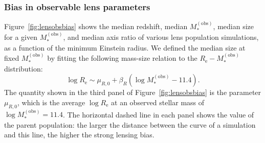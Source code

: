 \documentclass{aa}
\def\reff{R_{\mathrm{e}}}
\def\mobs{M_*^{(\mathrm{obs})}}
\def\Fref#1{Figure~\ref{#1}\xspace}
\begin{document}
\subsubsection{Bias in observable lens parameters}

\Fref{fig:lensobsbias} shows the median redshift, median $\mobs$, median size for a given $\mobs$, and median axis ratio of various lens population simulations, as a function of the minimum Einstein radius.
We defined the median size at fixed $\mobs$ by fitting the following mass-size relation to the $\reff-\mobs$ distribution:
\begin{equation}
\log{\reff} \sim \mu_{R,0} + \beta_R(\log{\mobs} - 11.4).
\end{equation}
The quantity shown in the third panel of \Fref{fig:lensobsbias} is the parameter $\mu_{R,0}$, which is the average $\log{\reff}$ at an observed stellar mass of $\log{\mobs}=11.4$.
The horizontal dashed line in each panel shows the value of the parent population: the larger the distance between the curve of a simulation and this line, the higher the strong lensing bias.

\end{document}
